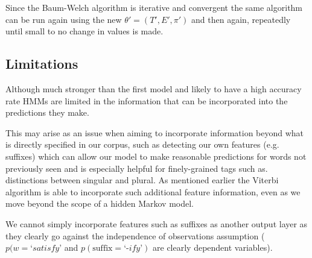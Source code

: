 \documentclass[../main.tex]{subfiles}
\begin{document}
Since the Baum-Welch algorithm is iterative and convergent the same algorithm can be run again using the new $\theta' = (T', E', \pi')$ and then again, repeatedly until small to no change in values is made.

\subsection{Limitations}

Although much stronger than the first model and likely to have a high accuracy rate HMMs are limited in the information that can be incorporated into the predictions they make.

This may arise as an issue when aiming to incorporate information beyond what is directly specified in our corpus, such as detecting our own features (e.g. suffixes) which can allow our model to make reasonable predictions for words not previously seen and is especially helpful for finely-grained tags such as. distinctions between singular and plural.
As mentioned earlier the Viterbi algorithm is able to incorporate such additional feature information, even as we move beyond the scope of a hidden Markov model.

We cannot simply incorporate features such as suffixes as another output layer as they clearly go against the independence of observations assumption ($p(w = \textit{`satisfy'}$ and $p(\text{suffix} = \textit{`-ify'})$ are clearly dependent variables).
\end{document}
